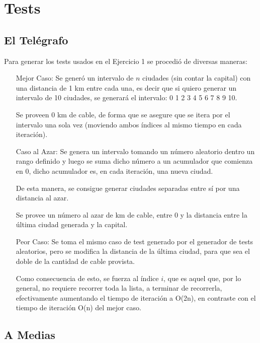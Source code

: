 \documentclass[spanish,a4paper]{article}
\begin{document}
\section{Tests}


\subsection{El Telégrafo}

Para generar los tests usados en el Ejercicio 1 se procedió de diversas maneras:

\begin{enumerate}

\item[Mejor Caso:] Se generó un intervalo de $n$ ciudades (sin contar la capital) con una distancia de 1 km entre cada una, es decir que si quiero generar un intervalo de 10 ciudades, se generará el intervalo: 0 1 2 3 4 5 6 7 8 9 10.

Se proveen 0 km de cable, de forma que se asegure que se itera por el intervalo una sola vez (moviendo ambos índices al mismo tiempo en cada iteración).

\item[Caso al Azar:] Se genera un intervalo tomando un número aleatorio dentro un rango definido y luego se suma dicho número a un acumulador que comienza en 0, dicho acumulador es, en cada iteración, una nueva ciudad.

De esta manera, se consigue generar ciudades separadas entre sí por una distancia al azar.

Se provee un número al azar de km de cable, entre 0 y la distancia entre la última ciudad generada y la capital.

\item[Peor Caso:] Se toma el mismo caso de test generado por el generador de tests aleatorios, pero se modifica la distancia de la última ciudad, para que sea el doble de la cantidad de cable provista.

Como consecuencia de esto, se fuerza al índice $i$, que es aquel que, por lo general, no requiere recorrer toda la lista, a terminar de recorrerla, efectivamente aumentando el tiempo de iteración a O(2n), en contraste con el tiempo de iteración O(n) del mejor caso.

\end{enumerate}


\subsection{A Medias}
\end{document}
